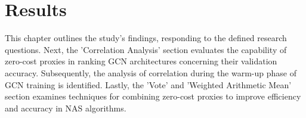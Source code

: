 \chapter{Results}\label{results}

This chapter outlines the study's findings, responding to the defined research questions. Next, the 'Correlation Analysis' section evaluates the capability of zero-cost proxies in ranking \gls{GCN} architectures concerning their validation accuracy. Subsequently, the analysis of correlation during the warm-up phase of \gls{GCN} training is identified. Lastly, the 'Vote' and 'Weighted Arithmetic Mean' section examines techniques for combining zero-cost proxies to improve efficiency and accuracy in \gls{NAS} algorithms.









%

